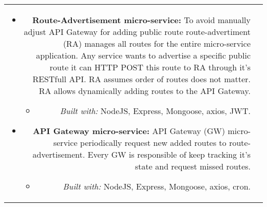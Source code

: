 \documentclass[a4paper,10pt]{article}
\begin{document}
\begin{longtable}{r p{16cm}}
\begin{itemize}
\begin{itemize}
            \end{itemize}
        \end{itemize}
        \begin{itemize}
            \item \textbf{Route-Advertisement micro-service:}
            To avoid manually adjust API Gateway for adding public route route-advertiment (RA) manages all routes for the entire micro-service application. Any service wants to advertise a specific public route it can HTTP POST this route to RA through it's RESTfull API. RA assumes order of routes does not matter. RA allows dynamically adding routes to the API Gateway.
            \begin{itemize}
                \item \textit{Built with: }NodeJS, Express, Mongoose, axios, JWT.
            \end{itemize} 
        \end{itemize}
        \begin{itemize}
            \item \textbf{API Gateway micro-service:}
            API Gateway (GW) micro-service periodically request new added routes to route-advertisement. Every GW is responsible of keep tracking it's state and request missed routes.
            \begin{itemize}
                \item \textit{Built with: }NodeJS, Express, Mongoose, axios, cron.
            \end{itemize} 
        \end{itemize}\\

    \end{longtable}
\label{LastPage}
\end{document}
